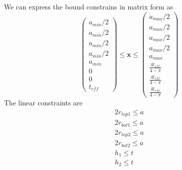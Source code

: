 \documentclass[12pt]{article}
\numberwithin{equation}{section}
\numberwithin{equation}{section}
\begin{document}
\begin{outline}[enumerate]
We can express the bound constrains in matrix form as
\begin{equation}
\left(
\begin{matrix}
a_{min}/2\\ 
a_{min}/2\\ 
a_{min}/2\\ 
a_{min}/2\\
a_{min}\\ 
0 \\
0 \\
t_{eff} 
\end{matrix} \right )
\leq \mathbf{x}
 \leq 
 \left(
\begin{matrix}
a_{max}/2 \\ a_{max}/2 \\ a_{max}/2 \\ a_{max}/2 \\ a_{max} \\ \frac {4t_{eff}}{4- \pi}\\  \frac {4t_{eff}}{4- \pi}\\ \frac {4t_{eff}}{4- \pi}
\end{matrix} \right )
\end{equation}
The linear constraints are 
\begin{align*} 
2 r_{top1} \leq a \\
2 r_{bot1} \leq a\\
2 r_{top2} \leq a\\
2 r_{bot2} \leq a \\
h_1 \leq t \\
h_2 \leq t
\end{align*}


\end{outline}
\end{document}
